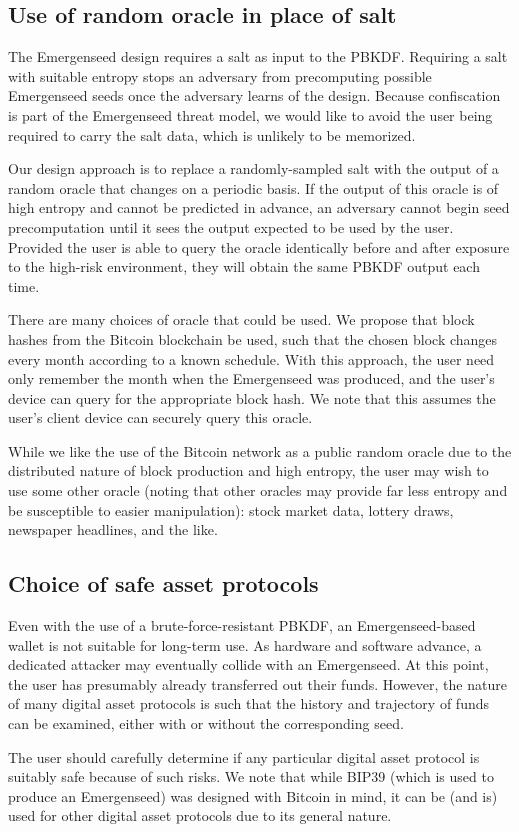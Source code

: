 \documentclass{article}
\begin{document}
\subsection{Use of random oracle in place of salt}

The Emergenseed design requires a salt as input to the PBKDF.
Requiring a salt with suitable entropy stops an adversary from precomputing possible Emergenseed seeds once the adversary learns of the design.
Because confiscation is part of the Emergenseed threat model, we would like to avoid the user being required to carry the salt data, which is unlikely to be memorized.

Our design approach is to replace a randomly-sampled salt with the output of a random oracle that changes on a periodic basis.
If the output of this oracle is of high entropy and cannot be predicted in advance, an adversary cannot begin seed precomputation until it sees the output expected to be used by the user.
Provided the user is able to query the oracle identically before and after exposure to the high-risk environment, they will obtain the same PBKDF output each time.

There are many choices of oracle that could be used.
We propose that block hashes from the Bitcoin blockchain be used, such that the chosen block changes every month according to a known schedule.
With this approach, the user need only remember the month when the Emergenseed was produced, and the user's device can query for the appropriate block hash.
We note that this assumes the user's client device can securely query this oracle.

While we like the use of the Bitcoin network as a public random oracle due to the distributed nature of block production and high entropy, the user may wish to use some other oracle (noting that other oracles may provide far less entropy and be susceptible to easier manipulation): stock market data, lottery draws, newspaper headlines, and the like.


\subsection{Choice of safe asset protocols}

Even with the use of a brute-force-resistant PBKDF, an Emergenseed-based wallet is not suitable for long-term use.
As hardware and software advance, a dedicated attacker may eventually collide with an Emergenseed.
At this point, the user has presumably already transferred out their funds.
However, the nature of many digital asset protocols is such that the history and trajectory of funds can be examined, either with or without the corresponding seed.

The user should carefully determine if any particular digital asset protocol is suitably safe because of such risks.
We note that while BIP39 (which is used to produce an Emergenseed) was designed with Bitcoin in mind, it can be (and is) used for other digital asset protocols due to its general nature.
\end{document}
